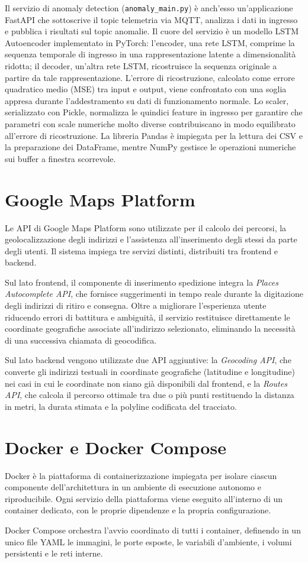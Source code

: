Il servizio di anomaly detection (\texttt{anomaly\_main.py}) è anch'esso un'applicazione FastAPI che sottoscrive il topic telemetria via MQTT, analizza i dati in ingresso e pubblica i risultati sul topic anomalie. Il cuore del servizio è un modello LSTM Autoencoder implementato in PyTorch: l'encoder, una rete LSTM, comprime la sequenza temporale di ingresso in una rappresentazione latente a dimensionalità ridotta; il decoder, un'altra rete LSTM, ricostruisce la sequenza originale a partire da tale rappresentazione. L'errore di ricostruzione, calcolato come errore quadratico medio (MSE) tra input e output, viene confrontato con una soglia appresa durante l'addestramento su dati di funzionamento normale. Lo scaler, serializzato con Pickle, normalizza le quindici feature in ingresso per garantire che parametri con scale numeriche molto diverse contribuiscano in modo equilibrato all'errore di ricostruzione. La libreria Pandas è impiegata per la lettura dei CSV e la preparazione dei DataFrame, mentre NumPy gestisce le operazioni numeriche sui buffer a finestra scorrevole.

\section{Google Maps Platform}

Le API di Google Maps Platform sono utilizzate per il calcolo dei percorsi, la geolocalizzazione degli indirizzi e l'assistenza all'inserimento degli stessi da parte degli utenti. Il sistema impiega tre servizi distinti, distribuiti tra frontend e backend.

Sul lato frontend, il componente di inserimento spedizione integra la \textit{Places Autocomplete API}, che fornisce suggerimenti in tempo reale durante la digitazione degli indirizzi di ritiro e consegna. Oltre a migliorare l'esperienza utente riducendo errori di battitura e ambiguità, il servizio restituisce direttamente le coordinate geografiche associate all'indirizzo selezionato, eliminando la necessità di una successiva chiamata di geocodifica.

Sul lato backend vengono utilizzate due API aggiuntive: la \textit{Geocoding API}, che converte gli indirizzi testuali in coordinate geografiche (latitudine e longitudine) nei casi in cui le coordinate non siano già disponibili dal frontend, e la \textit{Routes API}, che calcola il percorso ottimale tra due o più punti restituendo la distanza in metri, la durata stimata e la polyline codificata del tracciato.

\section{Docker e Docker Compose}

Docker è la piattaforma di containerizzazione impiegata per isolare ciascun componente dell'architettura in un ambiente di esecuzione autonomo e riproducibile. Ogni servizio della piattaforma viene eseguito all'interno di un container dedicato, con le proprie dipendenze e la propria configurazione.

Docker Compose orchestra l'avvio coordinato di tutti i container, definendo in un unico file YAML le immagini, le porte esposte, le variabili d'ambiente, i volumi persistenti e le reti interne. 